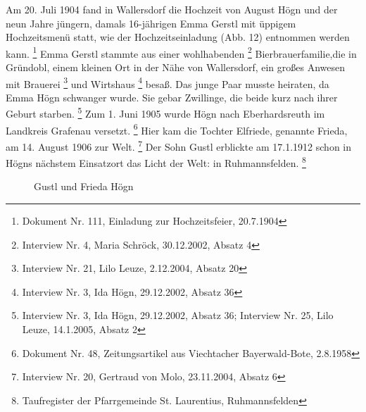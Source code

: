 Am 20. Juli 1904 fand in Wallersdorf die Hochzeit von August Högn und
der neun Jahre jüngern, damals 16-jährigen Emma Gerstl mit üppigem
Hochzeitsmenü statt, wie der Hochzeitseinladung (Abb. 12) entnommen
werden kann. \footnote{Dokument Nr. 111, Einladung zur Hochzeitsfeier,
20.7.1904} Emma Gerstl stammte aus einer wohlhabenden
\footnote{Interview Nr. 4, Maria Schröck, 30.12.2002, Absatz 4}
Bierbrauerfamilie,die in Gründobl, einem
kleinen Ort in der Nähe von Wallersdorf, ein großes Anwesen mit
Brauerei \footnote{Interview Nr. 21, Lilo Leuze, 2.12.2004, Absatz 20}
und Wirtshaus \footnote{Interview Nr. 3, Ida Högn, 29.12.2002, Absatz
36} besaß. Das junge Paar musste heiraten, da Emma Högn schwanger
wurde. Sie gebar Zwillinge, die beide kurz nach ihrer Geburt
starben. \footnote{Interview Nr. 3, Ida Högn, 29.12.2002, Absatz 36;
Interview Nr. 25, Lilo Leuze, 14.1.2005, Absatz 2} Zum 1. Juni 1905
wurde Högn nach Eberhardsreuth im Landkreis Grafenau
versetzt. \footnote{Dokument Nr. 48, Zeitungsartikel aus Viechtacher
Bayerwald-Bote, 2.8.1958} Hier kam die Tochter Elfriede, genannte
Frieda, am 14. August 1906 zur Welt. \footnote{Interview Nr. 20,
Gertraud von Molo, 23.11.2004, Absatz 6} Der Sohn Gustl erblickte am
17.1.1912 schon in Högns nächstem Einsatzort das Licht der Welt: in
Ruhmannsfelden. \footnote{Taufregister der Pfarrgemeinde St.
Laurentius, Ruhmannsfelden}

\begin{wrapfigure}{r}{0.3\textwidth}
\caption{Gustl und Frieda Högn}
\end{wrapfigure}

